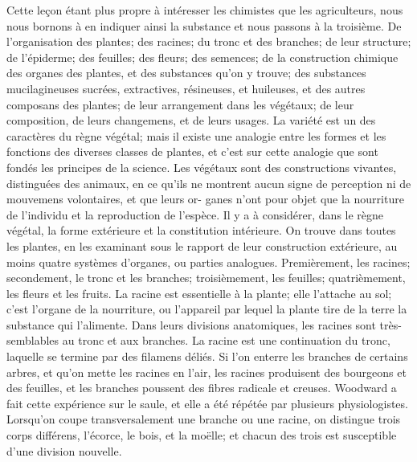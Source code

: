 Cette leçon étant plus propre à intéresser les chimistes que les agriculteurs, nous nous bornons à en indiquer ainsi la substance et nous passons à la troisième.
De l'organisation des plantes; des racines; du tronc et des branches; de leur structure; de l'épiderme; des feuilles; des fleurs; des semences; de la construction chimique des organes des plantes, et des substances qu'on y trouve; des substances mucilagineuses sucrées, extractives, résineuses, et huileuses, et des autres composans des plantes; de leur arrangement dans les végétaux; de leur composition, de leurs changemens, et de leurs usages.
La variété est un des caractères du règne végétal; mais il existe une analogie entre les formes et les fonctions des diverses classes de plantes, et c'est sur cette analogie que sont fondés les principes de la science. Les végétaux sont des constructions vivantes, distinguées des animaux, en ce qu'ils ne montrent aucun signe de perception ni de mouvemens volontaires, et que leurs or-\setcounter{page}{374} ganes n'ont pour objet que la nourriture de l'individu et la reproduction de l'espèce. Il y a à considérer, dans le règne végétal, la forme extérieure et la constitution intérieure.
On trouve dans toutes les plantes, en les examinant sous le rapport de leur construction extérieure, au moins quatre systèmes d'organes, ou parties analogues. Premièrement, les racines; secondement, le tronc et les branches; troisièmement, les feuilles; quatrièmement, les fleurs et les fruits.
La racine est essentielle à la plante; elle l'attache au sol; c'est l'organe de la nourriture, ou l'appareil par lequel la plante tire de la terre la substance qui l'alimente. Dans leurs divisions anatomiques, les racines sont très-semblables au tronc et aux branches. La racine est une continuation du tronc, laquelle se termine par des filamens déliés. Si l'on enterre les branches de certains arbres, et qu'on mette les racines en l'air, les racines produisent des bourgeons et des feuilles, et les branches poussent des fibres radicale et creuses. Woodward a fait cette expérience sur le saule, et elle a été répétée par plusieurs physiologistes.
Lorsqu'on coupe transversalement une branche ou une racine, on distingue trois\setcounter{page}{375} corps différens, l'écorce, le bois, et la moëlle; et chacun des trois est susceptible d'une division nouvelle.
